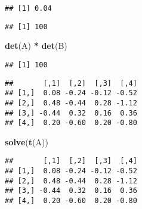 \documentclass[]{article}
\newenvironment{Shaded}{\begin{snugshade}}{\end{snugshade}}
\newcommand{\CommentTok}[1]{\textcolor[rgb]{0.56,0.35,0.01}{\textit{#1}}}
\newcommand{\KeywordTok}[1]{\textcolor[rgb]{0.13,0.29,0.53}{\textbf{#1}}}
\newcommand{\NormalTok}[1]{#1}
\newcommand{\OperatorTok}[1]{\textcolor[rgb]{0.81,0.36,0.00}{\textbf{#1}}}
\newcommand{\StringTok}[1]{\textcolor[rgb]{0.31,0.60,0.02}{#1}}
\begin{document}
\begin{verbatim}
## [1] 0.04
\end{verbatim}

\begin{Shaded}
\end{Shaded}

\begin{verbatim}
## [1] 100
\end{verbatim}

\begin{Shaded}
\begin{Highlighting}[]
\KeywordTok{det}\NormalTok{(A) }\OperatorTok{*}\StringTok{ }\KeywordTok{det}\NormalTok{(B)}
\end{Highlighting}
\end{Shaded}

\begin{verbatim}
## [1] 100
\end{verbatim}

\begin{Shaded}
\end{Shaded}

\begin{verbatim}
##       [,1]  [,2]  [,3]  [,4]
## [1,]  0.08 -0.24 -0.12 -0.52
## [2,]  0.48 -0.44  0.28 -1.12
## [3,] -0.44  0.32  0.16  0.36
## [4,]  0.20 -0.60  0.20 -0.80
\end{verbatim}

\begin{Shaded}
\begin{Highlighting}[]
\KeywordTok{solve}\NormalTok{(}\KeywordTok{t}\NormalTok{(A))}
\end{Highlighting}
\end{Shaded}

\begin{verbatim}
##       [,1]  [,2]  [,3]  [,4]
## [1,]  0.08 -0.24 -0.12 -0.52
## [2,]  0.48 -0.44  0.28 -1.12
## [3,] -0.44  0.32  0.16  0.36
## [4,]  0.20 -0.60  0.20 -0.80
\end{verbatim}

\begin{Shaded}
\end{Shaded}
\end{document}
